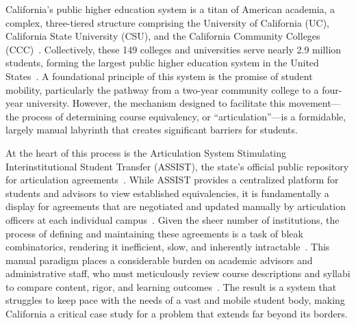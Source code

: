 
\begin{introduction}


California's public higher education system is a titan of American academia, a complex, three-tiered structure comprising the University of California (UC), California State University (CSU), and the California Community Colleges (CCC)~\cite{ppic}. Collectively, these 149 colleges and universities serve nearly 2.9 million students, forming the largest public higher education system in the United States~\cite{ppic,uc,calstate,cccco}. A foundational principle of this system is the promise of student mobility, particularly the pathway from a two-year community college to a four-year university. However, the mechanism designed to facilitate this movement---the process of determining course equivalency, or ``articulation''---is a formidable, largely manual labyrinth that creates significant barriers for students.

At the heart of this process is the Articulation System Stimulating Interinstitutional Student Transfer (ASSIST), the state's official public repository for articulation agreements~\cite{assistinfo}. While ASSIST provides a centralized platform for students and advisors to view established equivalencies, it is fundamentally a display for agreements that are negotiated and updated manually by articulation officers at each individual campus~\cite{assistfaq}. Given the sheer number of institutions, the process of defining and maintaining these agreements is a task of bleak combinatorics, rendering it inefficient, slow, and inherently intractable~\cite{pardos2019}. This manual paradigm places a considerable burden on academic advisors and administrative staff, who must meticulously review course descriptions and syllabi to compare content, rigor, and learning outcomes~\cite{pardos2019}. The result is a system that struggles to keep pace with the needs of a vast and mobile student body, making California a critical case study for a problem that extends far beyond its borders.


\end{introduction}
